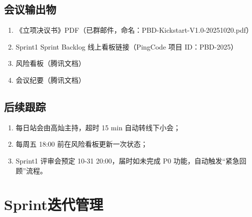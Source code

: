 \subsection{会议输出物}
\begin{enumerate}
    \item 《立项决议书》PDF（已群邮件，命名：PBD-Kickstart-V1.0-20251020.pdf）
    \item Sprint1 Sprint Backlog 线上看板链接（PingCode 项目 ID：PBD-2025）
    \item 风险看板（腾讯文档）
    \item 会议纪要（腾讯文档）
\end{enumerate}

\subsection{后续跟踪}
\begin{enumerate}
    \item 每日站会由高灿主持，超时 15 min 自动转线下小会；
    \item 每周五 18:00 前在风险看板更新一次状态；
    \item Sprint1 评审会预定 10-31 20:00，届时如未完成 P0 功能，自动触发“紧急回顾”流程。
\end{enumerate}

\section{Sprint迭代管理}

